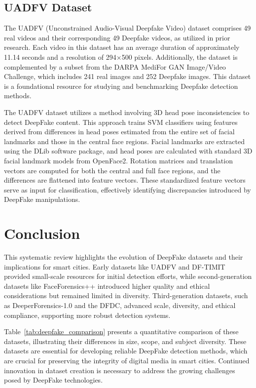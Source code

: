 \documentclass{article} %
\begin{document}
\subsection{UADFV Dataset}

The UADFV (Unconstrained Audio-Visual Deepfake Video) dataset comprises 49 real videos and their corresponding 49 Deepfake videos, as utilized in prior research. Each video in this dataset has an average duration of approximately 11.14 seconds and a resolution of 294×500 pixels. Additionally, the dataset is complemented by a subset from the DARPA MediFor GAN Image/Video Challenge, which includes 241 real images and 252 Deepfake images. This dataset is a foundational resource for studying and benchmarking Deepfake detection methods\cite{DBLP}.

The UADFV dataset utilizes a method involving 3D head pose inconsistencies to detect DeepFake content. This approach trains SVM classifiers using features derived from differences in head poses estimated from the entire set of facial landmarks and those in the central face regions. Facial landmarks are extracted using the DLib software package, and head poses are calculated with standard 3D facial landmark models from OpenFace2. Rotation matrices and translation vectors are computed for both the central and full face regions, and the differences are flattened into feature vectors. These standardized feature vectors serve as input for classification, effectively identifying discrepancies introduced by DeepFake manipulations\cite{DBLP}.

\section{Conclusion}

This systematic review highlights the evolution of DeepFake datasets and their implications for smart cities. Early datasets like UADFV and DF-TIMIT provided small-scale resources for initial detection efforts, while second-generation datasets like FaceForensics++ introduced higher quality and ethical considerations but remained limited in diversity. Third-generation datasets, such as DeeperForensics-1.0 and the DFDC, advanced scale, diversity, and ethical compliance, supporting more robust detection systems. 

Table~\ref{tab:deepfake_comparison} presents a quantitative comparison of these datasets, illustrating their differences in size, scope, and subject diversity. These datasets are essential for developing reliable DeepFake detection methods, which are crucial for preserving the integrity of digital media in smart cities. Continued innovation in dataset creation is necessary to address the growing challenges posed by DeepFake technologies.
\end{document}
